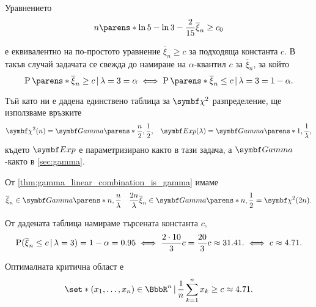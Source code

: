 \documentclass{../../common/topic}
\begin{document}
\begin{solution}
\begin{enumerate}[label=\alph*)]
    Уравнението
    \begin{equation*}
      n \parens*{\ln 5 - \ln 3 - \frac 2 {15} \overline \xi_n } \geq c_0
    \end{equation*}

    е еквивалентно на по-простото уравнение \( \overline \xi_n \geq c \) за подходяща константа \( c \). В такъв случай задачата се свежда до намиране на \( \alpha \)-квантил \( c \) за \( \overline \xi_n \), за който
    \begin{equation*}
      \Prob\parens*{\overline \xi_n \geq c \given \lambda = 3} = \alpha
      \iff
      \Prob\parens*{\overline \xi_n \leq c \given \lambda = 3} = 1 - \alpha.
    \end{equation*}

    Тъй като ни е дадена единствено таблица за \( \distr{\chi^2} \) разпределение, ще използваме връзките
    \begin{align*}
      \distr{\chi^2}(n) = \distr{Gamma} \parens*{\frac n 2, \frac 1 2 },
      &&
      \distr{Exp}(\lambda) = \distr{Gamma}\parens*{1, \frac 1 \lambda },
    \end{align*}
    където \( \distr{Exp} \) е параметризирано както в тази задача, а \( \distr{Gamma} \)-както в \cref{sec:gamma}.

    От \cref{thm:gamma_linear_combination_is_gamma} имаме
    \begin{align*}
      \overline \xi_n \in \distr{Gamma}\parens*{ n, \frac n \lambda }
      &&
      \frac {2n} \lambda \overline \xi_n \in \distr{Gamma}\parens*{ n, \frac 1 2 } = \distr{\chi^2}(2n).
    \end{align*}

    От дадената таблица намираме търсената константа \( c \),
    \begin{equation*}
      \Prob(\overline \xi_n \leq c \given \lambda = 3) = 1 - \alpha = 0.95
      \iff
      \frac {2 \cdot 10} 3 c = \frac {20} 3 c \approx 31.41.
      \iff
      c \approx 4.71.
    \end{equation*}

    Оптималната критична област е
    \begin{equation*}
      \set*{ (x_1, \ldots, x_n) \in \BbbR^n \given* \frac 1 n \sum_{k=1}^n x_k \geq c \approx 4.71 }.
    \end{equation*}
  \end{enumerate}
\end{solution}
\end{document}
